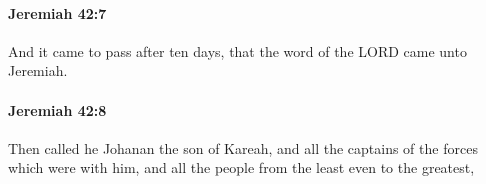 		\paragraph{Jeremiah 42:7} %
			\label{JEREMIAH-42-7}

			And it came to pass after ten days, that the word of the LORD came unto Jeremiah.


		\paragraph{Jeremiah 42:8} %
			\label{JEREMIAH-42-8}

			Then called he Johanan the son of Kareah, and all the captains of the forces which were with him, and all the people from the least even to the greatest,


